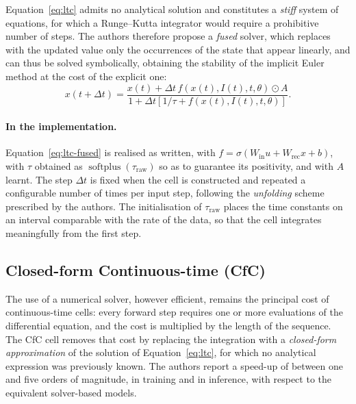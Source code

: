 Equation~\eqref{eq:ltc} admits no analytical solution and constitutes a
\emph{stiff} system of equations, for which a Runge--Kutta integrator would
require a prohibitive number of steps. The authors therefore propose a
\emph{fused} solver, which replaces with the updated value only the occurrences
of the state that appear linearly, and can thus be solved symbolically,
obtaining the stability of the implicit Euler method at the cost of the explicit
one:
\begin{equation}
  x(t + \Delta t)
    = \frac{x(t) + \Delta t\, f\!\left(x(t), I(t), t, \theta\right) \odot A}
           {1 + \Delta t\left[1/\tau + f\!\left(x(t), I(t), t, \theta\right)\right]} .
  \label{eq:ltc-fused}
\end{equation}

\paragraph{In the implementation.}
Equation~\eqref{eq:ltc-fused} is realised as written, with
$f = \sigma(W_{\text{in}} u + W_{\text{rec}} x + b)$, with $\tau$ obtained as
$\operatorname{softplus}(\tau_{\text{raw}})$ so as to guarantee its positivity,
and with $A$ learnt. The step $\Delta t$ is fixed when the cell is constructed
and repeated a configurable number of times per input step, following the
\emph{unfolding} scheme prescribed by the authors. The initialisation of
$\tau_{\text{raw}}$ places the time constants on an interval comparable with the
rate of the data, so that the cell integrates meaningfully from the first step.

\subsection{Closed-form Continuous-time (CfC)}
\label{sec:cell-cfc}

The use of a numerical solver, however efficient, remains the principal cost of
continuous-time cells: every forward step requires one or more evaluations of
the differential equation, and the cost is multiplied by the length of the
sequence. The CfC cell \cite{hasani2022cfc} removes that cost by replacing the
integration with a \emph{closed-form approximation} of the solution of
Equation~\eqref{eq:ltc}, for which no analytical expression was previously
known. The authors report a speed-up of between one and five orders of
magnitude, in training and in inference, with respect to the equivalent
solver-based models.

